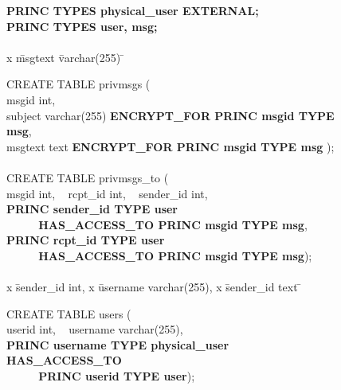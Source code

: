 \renewcommand{\FrameSep}{0.05in}
\begin{figure}[t!]
\begin{framed}
\footnotesize

\begin{tabbing}
{\bf PRINC TYPES physical\_user EXTERNAL;} \\
{\bf PRINC TYPES user, msg;} \\
\\

x \= msgtext \= varchar(255) \= \kill

CREATE TABLE privmsgs (\\
\> msgid \> int, \\
\> subject \> varchar(255) \> {\bf ENCRYPT\_FOR PRINC msgid TYPE msg}, \\
\> msgtext \> text \> {\bf ENCRYPT\_FOR PRINC msgid TYPE msg} ); \\
\\

CREATE TABLE privmsgs\_to (\\
\> msgid int, ~ rcpt\_id int, ~ sender\_id int, \\

\> {\bf PRINC sender\_id TYPE user} \\
\> {\bf ~ ~ ~ HAS\_ACCESS\_TO PRINC msgid TYPE msg}, \\
\> {\bf PRINC rcpt\_id TYPE user} \\
\> {\bf ~ ~ ~ HAS\_ACCESS\_TO PRINC msgid TYPE msg}); \\
\\

x \= sender\_id  int, x \= username varchar(255), x \= sender\_id text \= \kill

CREATE TABLE users (\\
 \> userid int, ~ username varchar(255), \\

\> {\bf PRINC username TYPE physical\_user HAS\_ACCESS\_TO} \\
\> {\bf ~ ~ ~ PRINC userid TYPE user}); 

\end{tabbing}


\end{framed}
\end{figure}
